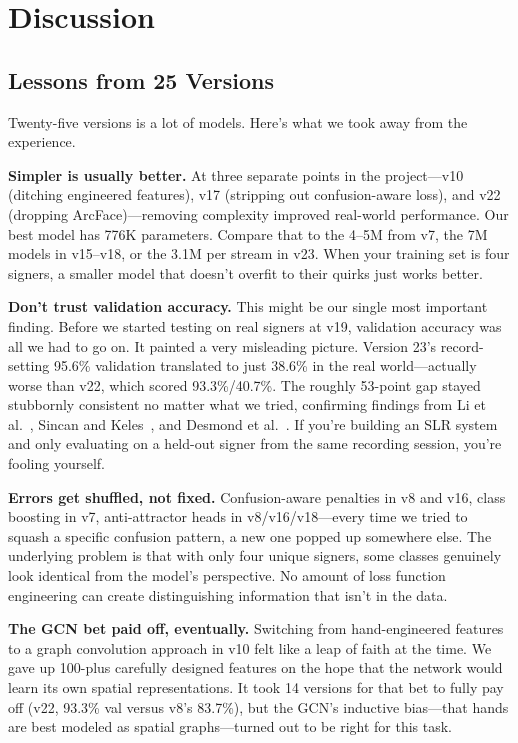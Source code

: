 \documentclass[conference]{IEEEtran}
\begin{document}
\section{Discussion}

\subsection{Lessons from 25 Versions}

Twenty-five versions is a lot of models. Here's what we took away from the experience.

\textbf{Simpler is usually better.} At three separate points in the project---v10 (ditching engineered features), v17 (stripping out confusion-aware loss), and v22 (dropping ArcFace)---removing complexity improved real-world performance. Our best model has 776K parameters. Compare that to the 4--5M from v7, the 7M models in v15--v18, or the 3.1M per stream in v23. When your training set is four signers, a smaller model that doesn't overfit to their quirks just works better.

\textbf{Don't trust validation accuracy.} This might be our single most important finding. Before we started testing on real signers at v19, validation accuracy was all we had to go on. It painted a very misleading picture. Version 23's record-setting 95.6\% validation translated to just 38.6\% in the real world---actually worse than v22, which scored 93.3\%/40.7\%. The roughly 53-point gap stayed stubbornly consistent no matter what we tried, confirming findings from Li et al.~\cite{li2020wlasl}, Sincan and Keles~\cite{sincan2020autsl}, and Desmond et al.~\cite{desmond2024}. If you're building an SLR system and only evaluating on a held-out signer from the same recording session, you're fooling yourself.

\textbf{Errors get shuffled, not fixed.} Confusion-aware penalties in v8 and v16, class boosting in v7, anti-attractor heads in v8/v16/v18---every time we tried to squash a specific confusion pattern, a new one popped up somewhere else. The underlying problem is that with only four unique signers, some classes genuinely look identical from the model's perspective. No amount of loss function engineering can create distinguishing information that isn't in the data.

\textbf{The GCN bet paid off, eventually.} Switching from hand-engineered features to a graph convolution approach in v10 felt like a leap of faith at the time. We gave up 100-plus carefully designed features on the hope that the network would learn its own spatial representations. It took 14 versions for that bet to fully pay off (v22, 93.3\% val versus v8's 83.7\%), but the GCN's inductive bias---that hands are best modeled as spatial graphs---turned out to be right for this task.
\end{document}
